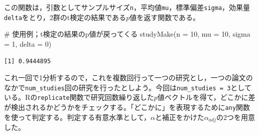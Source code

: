 \documentclass[
  a4paper,
]{ltjsbook}
\newenvironment{Shaded}{\begin{snugshade}}{\end{snugshade}}
\newcommand{\AttributeTok}[1]{\textcolor[rgb]{0.40,0.45,0.13}{#1}}
\newcommand{\CommentTok}[1]{\textcolor[rgb]{0.37,0.37,0.37}{#1}}
\newcommand{\ControlFlowTok}[1]{\textcolor[rgb]{0.00,0.23,0.31}{\textbf{#1}}}
\newcommand{\DecValTok}[1]{\textcolor[rgb]{0.68,0.00,0.00}{#1}}
\newcommand{\FunctionTok}[1]{\textcolor[rgb]{0.28,0.35,0.67}{#1}}
\newcommand{\NormalTok}[1]{\textcolor[rgb]{0.00,0.23,0.31}{#1}}
\newcommand{\OtherTok}[1]{\textcolor[rgb]{0.00,0.23,0.31}{#1}}
\newcommand{\SpecialCharTok}[1]{\textcolor[rgb]{0.37,0.37,0.37}{#1}}
\begin{document}
\begin{Shaded}
\end{Shaded}

この関数は，引数としてサンプルサイズ\texttt{n}，平均値\texttt{mu}，標準偏差\texttt{sigma}，効果量\texttt{delta}をとり，2群のt検定の結果である\(p\)値を返す関数である。

\begin{Shaded}
\begin{Highlighting}[]
\CommentTok{\# 使用例；t検定の結果のp値が戻ってくる}
\FunctionTok{studyMake}\NormalTok{(}\AttributeTok{n =} \DecValTok{10}\NormalTok{, }\AttributeTok{mu =} \DecValTok{10}\NormalTok{, }\AttributeTok{sigma =} \DecValTok{1}\NormalTok{, }\AttributeTok{delta =} \DecValTok{0}\NormalTok{)}
\end{Highlighting}
\end{Shaded}

\begin{verbatim}
[1] 0.9444895
\end{verbatim}

これ一回で1分析するので，これを複数回行って一つの研究とし，一つの論文のなかで\texttt{num\_studies}回の研究を行ったとしよう。今回は\texttt{num\_studies\ =\ 3}としている。Rの\texttt{replicate}関数で研究回数繰り返した\(p\)値ベクトルを得て，どこかに差が検出されるかどうかをチェックする。「どこかに」を表現するために\texttt{any}関数を使って判定する。判定する有意水準として，\(\alpha\)と補正をかけた\(\alpha_{adj}\)の2つを用意した。
\end{document}
